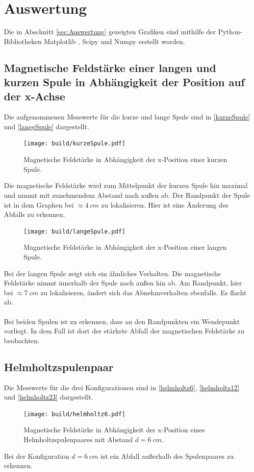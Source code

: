 \section{Auswertung}
\label{sec:Auswertung}
Die in Abschnitt \autoref{sec:Auswertung} gezeigten Grafiken sind mithilfe der Python-Bibliotheken Matplotlib \cite{matplotlib}, Scipy \cite{scipy} und Numpy \cite{numpy}
erstellt worden.
\subsection{Magnetische Feldstärke einer langen und kurzen Spule in Abhängigkeit der Position auf der x-Achse}

Die aufgenommenen Messwerte für die kurze und lange Spule sind in \autoref{kurzeSpule} und \autoref{langeSpule} dargestellt.
\begin{figure}[H]
    \texttt{[image: build/kurzeSpule.pdf]}
    \caption{Magnetische Feldstärke in Abhängigkeit der x-Position einer kurzen Spule.}
    \label{kurzeSpule}
\end{figure}
Die magnetische Feldstärke wird zum Mittelpunkt der kurzen Spule hin maximal und nimmt mit zunehmendem Abstand nach außen ab. 
Der Randpunkt der Spule ist in dem Graphen bei $\approx \SI{4}{cm}$ zu lokalisieren. Hier ist eine Änderung des Abfalls zu erkennen.

\begin{figure}[H]
    \texttt{[image: build/langeSpule.pdf]}
    \caption{Magnetische Feldstärke in Abhängigkeit der x-Position einer langen Spule.}
    \label{langeSpule}
\end{figure}
Bei der langen Spule zeigt sich ein ähnliches Verhalten. Die magnetische Feldstärke nimmt innerhalb der Spule nach außen hin ab. Am Randpunkt, hier bei 
$\approx \SI{7}{cm}$ zu lokalisieren, ändert sich das Abnehmverhalten ebenfalls. Es flacht ab.
\\
\\
Bei beiden Spulen ist zu erkennen, dass an den Randpunkten ein Wendepunkt vorliegt. In dem Fall ist dort der stärkste Abfall der magnetischen
Feldstärke zu beobachten.
\newpage
\subsection{Helmholtzspulenpaar}
Die Messwerte für die drei Konfigurationen sind in \autoref{helmholtz6}, \autoref{helmholtz12} und \autoref{helmholtz23} dargestellt.

\begin{figure}[H]
    \texttt{[image: build/helmholtz6.pdf]}
    \caption{Magnetische Feldstärke in Abhängigkeit der x-Position eines Helmholtzspulenpaares mit Abstand $d =\SI{6}{cm}$.}
    \label{helmholtz6}
\end{figure}
Bei der Konfiguration $d = \SI{6}{cm}$ ist ein Abfall außerhalb des Spulenpaares zu erkennen.

